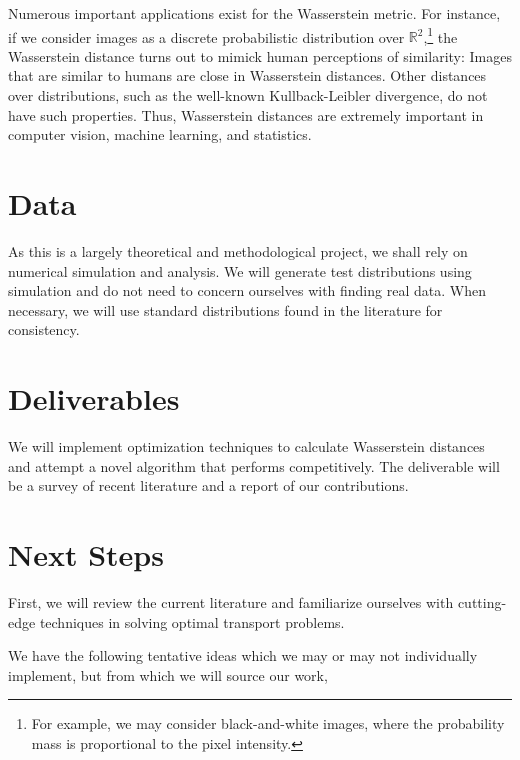 \documentclass{amsart}
\begin{document}
Numerous important applications exist for the Wasserstein metric. For instance, if we consider images as a discrete probabilistic distribution over $\mathbb{R}^2$,\footnote{For example, we may consider black-and-white images, where the probability mass is proportional to the pixel intensity.} the Wasserstein distance turns out to mimick human perceptions of similarity: Images that are similar to humans are close in Wasserstein distances. Other distances over distributions, such as the well-known Kullback-Leibler divergence, do not have such properties. Thus, Wasserstein distances are extremely important in computer vision, machine learning, and statistics. 

\section{Data}

As this is a largely theoretical and methodological project, we shall rely on numerical simulation and analysis. We will generate test distributions using simulation
and do not need to concern ourselves with finding real data. When necessary, we
will use standard distributions found in the literature for consistency. 

\section{Deliverables}

We will implement optimization techniques to calculate Wasserstein distances and
attempt a novel algorithm that performs competitively. The deliverable will be a survey of recent literature and a report of our contributions.

\section{Next Steps}

First, we will review the current literature and familiarize ourselves with cutting-edge techniques in solving optimal transport problems. 

We have the following tentative ideas which we may or may not individually
implement, but from which we will source our  work,
\end{document}
